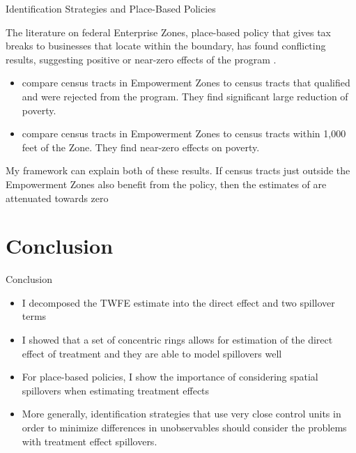 \documentclass[aspectratio=169]{beamer}
\begin{document}
\begin{frame}{Identification Strategies and Place-Based Policies}

    The literature on federal Enterprise Zones, place-based policy that gives tax breaks to businesses that locate within the boundary, has found conflicting results, suggesting positive or near-zero effects of the program \citep{Neumark_Young_2019}. 
    
    \begin{itemize}
        \pause
        \item \citet{Busso_Gregory_Kline_2013} compare census tracts in Empowerment Zones to census tracts that qualified and were rejected from the program. They find significant large reduction of poverty.
        
        \pause
        \item \citet{Neumark_Kolko_2010} compare census tracts in Empowerment Zones to census tracts within 1,000 feet of the Zone. They find near-zero effects on poverty.
    \end{itemize}

    \pause
    My framework can explain both of these results. If census tracts just outside the Empowerment Zones also benefit from the policy, then the estimates of \citet{Neumark_Kolko_2010} are attenuated towards zero

\end{frame}





\section{Conclusion}

\begin{frame}{Conclusion}
    \begin{itemize}
        \item I decomposed the TWFE estimate into the direct effect and two spillover terms
        
        \item I showed that a set of concentric rings allows for estimation of the direct effect of treatment and they are able to model spillovers well
        
        \item For place-based policies, I show the importance of considering spatial spillovers when estimating treatment effects
        
        \item More generally, identification strategies that use very close control units in order to minimize differences in unobservables should consider the problems with treatment effect spillovers.
    \end{itemize}
\end{frame}
\end{document}
